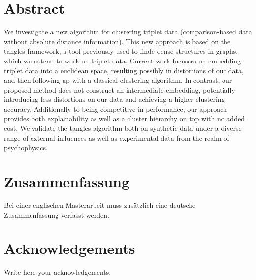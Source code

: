 \documentclass[twoside,12pt,a4paper]{report}
\begin{document}

\setcounter{page}{1}



\section*{Abstract}
We investigate a new algorithm for clustering triplet data (comparison-based data 
without absolute distance information). This new approach is based on the tangles framework,
a tool previously used to finde dense structures in graphs, which 
we extend to work on triplet data. Current work focusses
on embedding triplet data into a euclidean space, resulting possibly in distortions of our data,
and then following up with a classical clustering algorithm. In contrast, our proposed method
does not construct an intermediate embedding, potentially introducing less distortions
on our data and achieving a higher clustering accuracy. Additionally to being
competitive in performance, our approach provides both explainability as well as a cluster 
hierarchy on top with no added cost. We validate the tangles algorithm both on synthetic data 
under a diverse range of external influences as well as experimental data from the realm of psychophysics.

\newpage
\section*{Zusammenfassung}

Bei einer englischen Masterarbeit muss zus\"atzlich eine deutsche Zusammenfassung verfasst werden.

\newpage
\section*{Acknowledgements}

Write here your acknowledgements.

\cleardoublepage


\renewcommand{\baselinestretch}{1.3}
\small\normalsize
\end{document}
